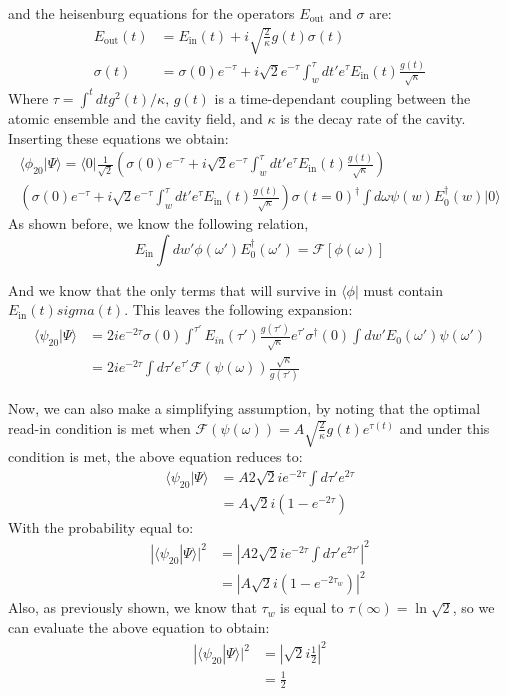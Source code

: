 \documentclass[12pt]{article}
\begin{document}
and the heisenburg equations for the operators $E_\textrm{out}$ and $\sigma$ are:
\begin{align}
E_\textrm{out}(t) &= E_\textrm{in}(t) + i \sqrt{\frac{2}{\kappa}} g(t) \sigma(t) \\
\sigma(t) &= \sigma(0) e^{-\tau} + i\sqrt{2} e^{-\tau} \int^\tau_w d t' e^\tau E_\textrm{in}(t) \frac{g(t)}{\sqrt{\kappa}}
\end{align}
Where $\tau = \int^t dt g^2(t)/\kappa$, $g(t)$ is a time-dependant coupling between the atomic ensemble and the cavity field, and $\kappa$ is the decay rate of the cavity. Inserting these equations we obtain:
\begin{multline}
\langle \phi_{20}| \Psi \rangle =\langle 0 | \frac{1}{\sqrt{2}} \left (  \sigma(0) e^{-\tau} + i\sqrt{2} e^{-\tau} \int^\tau_w d t' e^\tau E_\textrm{in}(t) \frac{g(t)}{\sqrt{\kappa}} \right )\\ \left ( \sigma(0) e^{-\tau} + i\sqrt{2} e^{-\tau} \int^\tau_w d t' e^\tau E_\textrm{in}(t) \frac{g(t)}{\sqrt{\kappa}} \right ) \sigma(t=0)^\dagger \int d\omega \psi(w) E_0^\dagger(w) | 0 \rangle
\end{multline}
As shown before, we know the following relation,
\begin{equation}
E_\textrm{in} \int dw' \phi(\omega') E_0^\dagger(\omega') = \mathscr{F}[\phi(\omega)]
\end{equation}

And we know that the only terms that will survive in $\langle \phi |$ must contain $E_\textrm{in}(t) sigma(t)$. This leaves the following expansion:
\begin{align}
\langle \psi_{20}| \Psi \rangle &= 2 i e^{-2\tau} \sigma(0) 
\int^{\tau'} E_{in}(\tau') \frac{g(\tau')}{\sqrt{\kappa}} e^{\tau'} \sigma^\dagger(0) \int dw' E_0(\omega') \psi(\omega')\\ 
&= 2 i e^{-2 \tau} \int d \tau' e^{\tau'} 
 \mathscr{F}(\psi(\omega)) \frac{\sqrt{\kappa}}{g(\tau')}
\end{align}

Now, we can also make a simplifying assumption, by noting that the optimal read-in condition is met when $\mathscr{F}(\psi(\omega)) =A \sqrt{\frac{2}{\kappa}} g(t) e^{\tau(t)}$ and under this condition is met, the above equation reduces to:
\begin{align}
\langle \psi_{20}| \Psi \rangle & =A 2\sqrt{2} i e^{-2\tau} \int d \tau' e^{2 \tau} \\
& =A \sqrt{2} i\left(1- e^{-2\tau}\right)
\end{align}
With the probability equal to:
\begin{align}
\label{p20}
|\langle \psi_{20}| \Psi \rangle|^2 &=|A 2\sqrt{2} i e^{-2\tau} \int d \tau' e^{2 \tau'}|^2 \\
&= |A  \sqrt{2} i (1-e^{-2\tau_w})|^2
\end{align}
Also, as previously shown, we know that $\tau_w$ is equal to $\tau(\infty) = \ln{\sqrt{2}}$, so we can evaluate the above equation to obtain:
\begin{align}
|\langle \psi_{20}| \Psi \rangle|^2 &= |\sqrt{2} i \frac{1}{2}|^2 \\
&= \frac{1}{2}
\end{align}
\end{document}
